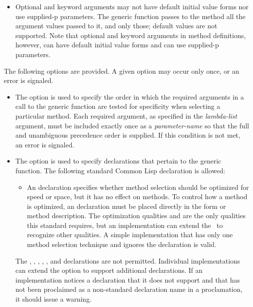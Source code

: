 \begin{defmac}
\begin{itemize}
\item 
Optional and keyword arguments may not have default initial value forms
nor use supplied-p parameters.
The generic function passes to the method all the argument values passed to
it, and only those; default values are not supported.
Note that optional and keyword arguments in method definitions, however,
can have default initial value forms and can use supplied-p parameters. 
\end{itemize}

The following options are provided.  A given option may occur only once,
or an error is signaled.

\begin{itemize}
 
\item  
The  option is used to specify the
order in which the required arguments in a call to the generic
function are tested for specificity when selecting a particular
method.  Each required argument, as specified in the {\it lambda-list\/}
argument, must be included exactly once as a {\it
parameter-name} so that the full and unambiguous precedence order is
supplied.  If this condition is not met, an error is signaled.

\item 
The  option is used to specify declarations that pertain
to the generic function.  The following standard Common Lisp
declaration is allowed:

\begin{itemize}
\item
An  declaration specifies whether method selection
should be optimized for speed or space, but it has no effect on
methods.  To control how a method is optimized, an 
declaration must be placed directly in the  form or
method description.  The optimization qualities  and 
 are the only qualities this standard requires, but an
implementation can extend the \CLOS\ to recognize other qualities.  A
simple implementation that has only one method selection technique and
ignores the  declaration is valid.
\end{itemize}

The , , , , 
, and  declarations are not permitted.
Individual implementations can extend the  option to
support additional declarations.  If an implementation notices a
declaration that it does not support and that has not been proclaimed
as a non-standard declaration name in a  proclamation, it
should issue a warning.


\end{itemize}
\end{defmac}
